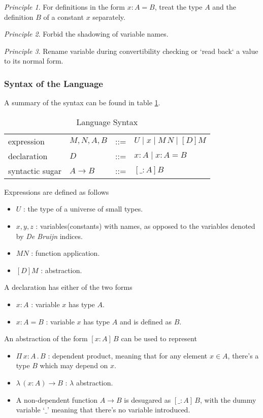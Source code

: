 \documentclass{article}
\theoremstyle{remark}
\newtheorem{principle}{Principle}
\begin{document}
\begin{principle} \label{p1}
  For definitions in the form $x : A = B$, treat the type $A$ and the definition $B$ of a constant $x$ separately.
\end{principle}

\begin{principle} \label{p2}
  Forbid the shadowing of variable names.
\end{principle}

\begin{principle} \label{p3}
  Rename variable during convertibility checking or `read back` a value to its normal form. 
\end{principle}

\subsubsection{Syntax of the Language}
A summary of the syntax can be found in table \ref{tab:syntax}.
\begin{table}[h]
  \centering
  \begin{tabular}{l l l l}
    expression & $M,N,A,B$ & ::= & $U \mid x \mid M \, N \mid [D] M $ \\
    declaration & $D$ & ::= & $x : A \mid x : A = B$ \\
    syntactic sugar & $A \to B$ & ::= & $[\_ : A] B $
  \end{tabular}
  \caption{Language Syntax}
  \label{tab:syntax}
\end{table}

Expressions are defined as follows
\begin{itemize}
\item $U$ : the type of a universe of small types. 
\item $x, y, z$ : variables(constants) with names, as opposed to the variables denoted by \emph{De Bruijn} indices.
\item $M N$ : function application.
\item $[D] M$ : abstraction.
\end{itemize}
A declaration has either of the two forms
\begin{itemize}
\item $x : A$ : variable $x$ has type $A$.
\item $x : A = B$ : variable $x$ has type $A$ and is defined as $B$.
\end{itemize}

An abstraction of the form $[x : A]\,B$ can be used to represent
\begin{itemize}
\item $\Pi\,x:A\,.\,B$ : dependent product, meaning that for any element $x \in A$, there's a type $B$ which may depend on $x$.
\item $\lambda\,(x : A) \to B$ : $\lambda$ abstraction.
\item A non-dependent function $A \to B$ is desugared as $[\_ : A]\, B$, with the dummy variable `$\_$' meaning that there's no variable introduced.
\end{itemize}
\end{document}
